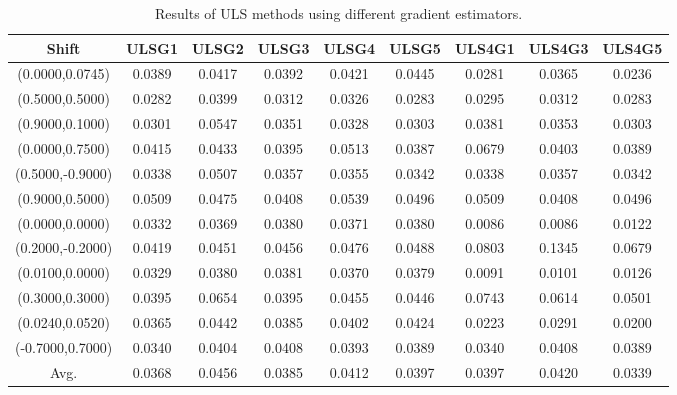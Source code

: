 \begin{table}[ht!]
\centering
\begin{tabular}{c|c|c|c|c|c|c|c|c}
Shift & \scriptsize{ULSG1} & \scriptsize{ULSG2} & \scriptsize{ULSG3} & \scriptsize{ULSG4} & \scriptsize{ULSG5} & \scriptsize{ULS4G1} & \scriptsize{ULS4G3} & \scriptsize{ULS4G5}\\ \hline 
(0.0000,0.0745) & 0.0389 & 0.0417 & 0.0392 & 0.0421 & 0.0445 & 0.0281 & 0.0365 & 0.0236 \\ \hline
(0.5000,0.5000) & 0.0282 & 0.0399 & 0.0312 & 0.0326 & 0.0283 & 0.0295 & 0.0312 & 0.0283 \\ \hline
(0.9000,0.1000) & 0.0301 & 0.0547 & 0.0351 & 0.0328 & 0.0303 & 0.0381 & 0.0353 & 0.0303 \\ \hline
(0.0000,0.7500) & 0.0415 & 0.0433 & 0.0395 & 0.0513 & 0.0387 & 0.0679 & 0.0403 & 0.0389 \\ \hline
(0.5000,-0.9000) & 0.0338 & 0.0507 & 0.0357 & 0.0355 & 0.0342 & 0.0338 & 0.0357 & 0.0342 \\ \hline
(0.9000,0.5000) & 0.0509 & 0.0475 & 0.0408 & 0.0539 & 0.0496 & 0.0509 & 0.0408 & 0.0496 \\ \hline
(0.0000,0.0000) & 0.0332 & 0.0369 & 0.0380 & 0.0371 & 0.0380 & 0.0086 & 0.0086 & 0.0122 \\ \hline
(0.2000,-0.2000) & 0.0419 & 0.0451 & 0.0456 & 0.0476 & 0.0488 & 0.0803 & 0.1345 & 0.0679 \\ \hline
(0.0100,0.0000) & 0.0329 & 0.0380 & 0.0381 & 0.0370 & 0.0379 & 0.0091 & 0.0101 & 0.0126 \\ \hline
(0.3000,0.3000) & 0.0395 & 0.0654 & 0.0395 & 0.0455 & 0.0446 & 0.0743 & 0.0614 & 0.0501 \\ \hline
(0.0240,0.0520) & 0.0365 & 0.0442 & 0.0385 & 0.0402 & 0.0424 & 0.0223 & 0.0291 & 0.0200 \\ \hline
(-0.7000,0.7000) & 0.0340 & 0.0404 & 0.0408 & 0.0393 & 0.0389 & 0.0340 & 0.0408 & 0.0389 \\ \hline
Avg.  & 0.0368 & 0.0456 & 0.0385 & 0.0412 & 0.0397 & 0.0397 & 0.0420 & 0.0339 \\ \hline
\end{tabular}
\caption{Results of ULS methods using different gradient estimators.}
\label{tab:ULSperShift}
\end{table}


